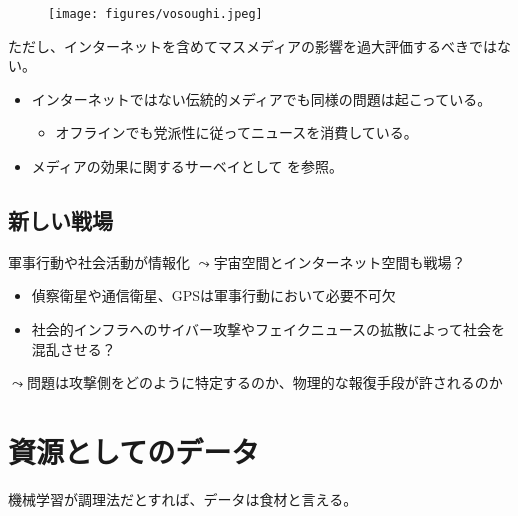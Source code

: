 \documentclass[
  xelatex,
  ja=standard]{bxjsarticle}
\providecommand{\tightlist}{%
  \setlength{\itemsep}{0pt}\setlength{\parskip}{0pt}}\usepackage{longtable,booktabs,array}
\begin{document}
\begin{figure}[htpb]

{\centering \texttt{[image: figures/vosoughi.jpeg]}

}

\caption{\citet{vosoughi2018}}

\end{figure}

ただし、インターネットを含めてマスメディアの影響を過大評価するべきではない。

\begin{itemize}
\tightlist
\item
  インターネットではない伝統的メディアでも同様の問題は起こっている。

  \begin{itemize}
  \tightlist
  \item
    オフラインでも党派性に従ってニュースを消費している\citep{gentzkow2011, martin2017}。
  \end{itemize}
\item
  メディアの効果に関するサーベイとして \citet{inamasu2022} を参照。
\end{itemize}

\hypertarget{ux65b0ux3057ux3044ux6226ux5834}{%
\subsection{新しい戦場}\label{ux65b0ux3057ux3044ux6226ux5834}}

軍事行動や社会活動が情報化
\(\leadsto\)宇宙空間とインターネット空間も戦場？

\begin{itemize}
\tightlist
\item
  偵察衛星や通信衛星、GPSは軍事行動において必要不可欠
\item
  社会的インフラへのサイバー攻撃やフェイクニュースの拡散によって社会を混乱させる？
\end{itemize}

\(\leadsto\)問題は攻撃側をどのように特定するのか、物理的な報復手段が許されるのか

\hypertarget{ux8cc7ux6e90ux3068ux3057ux3066ux306eux30c7ux30fcux30bf}{%
\section{資源としてのデータ}\label{ux8cc7ux6e90ux3068ux3057ux3066ux306eux30c7ux30fcux30bf}}

機械学習が調理法だとすれば、データは食材と言える。
\end{document}
